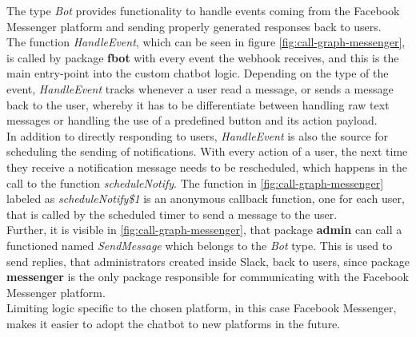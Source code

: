 The type \emph{Bot} provides functionality to handle events coming from the Facebook Messenger platform
and sending properly generated responses back to users.
\\
The function \emph{HandleEvent}, which can be seen in figure \ref{fig:call-graph-messenger},
is called by package \textbf{fbot} with every event the webhook receives,
and this is the main entry-point into the custom chatbot logic.
Depending on the type of the event,
\emph{HandleEvent} tracks whenever a user read a message,
or sends a message back to the user,
whereby it has to be differentiate between handling raw text messages
or handling the use of a predefined button and its action payload.
\\

In addition to directly responding to users,
\emph{HandleEvent} is also the source for scheduling the sending of notifications.
With every action of a user, the next time they receive a notification message needs to be rescheduled,
which happens in the call to the function \emph{scheduleNotify}.
The function in \ref{fig:call-graph-messenger} labeled as \emph{scheduleNotify\$1} is an anonymous callback function,
one for each user, that is called by the scheduled timer to send a message to the user.
\\

Further, it is visible in \ref{fig:call-graph-messenger},
that package \textbf{admin} can call a functioned named \emph{SendMessage} which belongs to the \emph{Bot} type.
This is used to send replies, that administrators created inside Slack, back to users,
since package \textbf{messenger} is the only package responsible for communicating with the Facebook Messenger platform.
\\

Limiting logic specific to the chosen platform, in this case Facebook Messenger,
makes it easier to adopt the chatbot to new platforms in the future.

